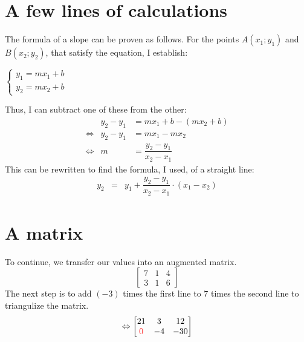 \documentclass[footheight=20pt, footsepline, headheight=20pt, headsepline]{scrartcl}
\begin{document}
\section{A few lines of calculations}
The formula of a slope can be proven as follows. For the points $A(x_1;y_1)$ and $B(x_2;y_2)$, that satisfy the equation, I establish:\begin{center}
$\begin{cases}
y_1=mx_1+b\\
y_2=mx_2+b
\end{cases}$
\end{center}
Thus, I can subtract one of these from the other:
\begin{eqnarray*}
&y_2-y_1 &= mx_1+b-(mx_2+b)\\
\Leftrightarrow& y_2-y_1 &= mx_1-mx_2\\
\Leftrightarrow& m &= \dfrac{y_2-y_1}{x_2-x_1}
\end{eqnarray*}
This can be rewritten to find the formula, I used, of a straight line:
\begin{eqnarray*}
y_2&=&y_1+\dfrac{y_2-y_1}{x_2-x_1}\cdot(x_1-x_2)
\end{eqnarray*}
\section{A matrix}
To continue, we transfer our values into an augmented matrix.
$$
\begin{bmatrix}
    7 & 1 & 4 \\
    3 & 1 & 6
\end{bmatrix}
$$
The next step is to add $(-3)$ times the first line to $7$ times the second line to triangulize the matrix.
$$
\Leftrightarrow
\begin{bmatrix}
    21 & 3 & 12\\
    \textcolor{red}{0} & -4 & -30
\end{bmatrix}
$$
\newpage
\end{document}
